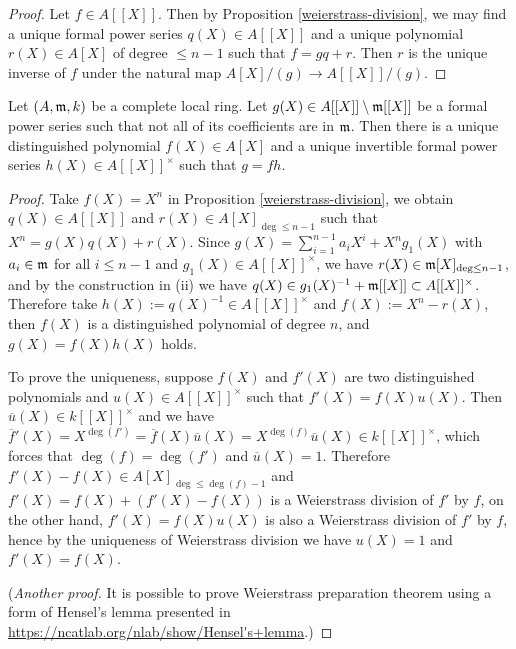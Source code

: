 \begin{proof}
\leanok
Let $f\in A[[X]]$.
Then by Proposition \ref{weierstrass-division},
we may find a unique formal power series
$q(X)\in A[[X]]$ and a unique polynomial $r(X)\in A[X]$ of degree $\leq n-1$
such that $f=gq+r$.
Then $r$ is the unique inverse of $f$ under the natural map $A[X]/(g)\to A[[X]]/(g)$.
\end{proof}

\begin{prop}
\label{weierstrass-preparation}
\leanok
Let $(A,{\mathfrak{m}},k)$ be a complete local ring.
Let $g(X)\in A[[X]]\setminus{\mathfrak{m}}[[X]]$ be a formal power series
such that not all of its coefficients are in ${\mathfrak{m}}$.
Then there is a unique distinguished polynomial $f(X)\in A[X]$
and a unique invertible formal power series $h(X)\in A[[X]]^\times$ such that $g=fh$.
\end{prop}

\begin{proof}
\leanok
Take $f(X)=X^n$ in Proposition \ref{weierstrass-division}, we obtain $q(X)\in A[[X]]$
and $r(X)\in A[X]_{\deg\leq n-1}$ such that $X^n=g(X)q(X)+r(X)$.
Since $g(X)=\sum_{i=1}^{n-1}a_iX^i+X^ng_1(X)$
with $a_i\in{\mathfrak{m}}$ for all $i\leq n-1$ and $g_1(X)\in A[[X]]^\times$,
we have $r(X)\in{\mathfrak{m}}[X]_{\deg\leq n-1}$, and by the construction in (ii)
we have $q(X)\in g_1(X)^{-1}+{\mathfrak{m}}[[X]]\subset A[[X]]^\times$.
Therefore take $h(X):=q(X)^{-1}\in A[[X]]^\times$
and $f(X):=X^n-r(X)$, then $f(X)$ is a distinguished polynomial of degree $n$,
and $g(X)=f(X)h(X)$ holds.

To prove the uniqueness, suppose $f(X)$ and $f'(X)$ are two distinguished polynomials
and $u(X)\in A[[X]]^\times$ such that $f'(X)=f(X)u(X)$.
Then $\overline u(X)\in k[[X]]^\times$ and we have
$\overline f{}'(X)=X^{\deg(f')}=\overline f(X)\overline u(X)
=X^{\deg(f)}\overline u(X)\in k[[X]]^\times$,
which forces that $\deg(f)=\deg(f')$ and $\overline u(X)=1$.
Therefore $f'(X)-f(X)\in A[X]_{\deg\leq\deg(f)-1}$
and $f'(X)=f(X)+(f'(X)-f(X))$ is a Weierstrass division of $f'$ by $f$,
on the other hand, $f'(X)=f(X)u(X)$ is also a Weierstrass division of $f'$ by $f$,
hence by the uniqueness of Weierstrass division
we have $u(X)=1$ and $f'(X)=f(X)$.

(\emph{Another proof.}
It is possible to prove Weierstrass preparation theorem using a form
of Hensel's lemma presented in \url{https://ncatlab.org/nlab/show/Hensel's+lemma}.)
\end{proof}

